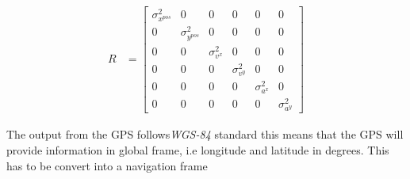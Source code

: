 \begin{align}
R&=
\begin{bmatrix}
\sigma^2_{x^{pos}} & 0 & 0 & 0 & 0 & 0\\
0 & \sigma^2_{y^{pos}} & 0 & 0 & 0 & 0\\
0 & 0 & \sigma^2_{v^{x}} & 0 & 0 & 0\\
0 & 0 & 0 & \sigma^2_{v^{y}} & 0 & 0\\
0 & 0 & 0 & 0 & \sigma^2_{a^{x}} & 0\\
0 & 0 & 0 & 0 & 0 & \sigma^2_{a^{y}}
\end{bmatrix}
\end{align}

The output from the GPS follows\emph{WGS-84} standard this means that the GPS will provide information in global frame, i.e longitude and latitude in degrees. This has to be convert into a navigation frame










\pagebreak








